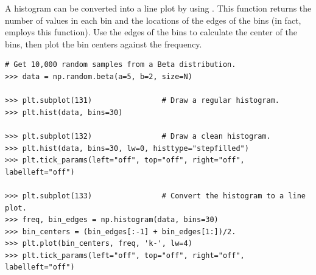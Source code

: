 A histogram can be converted into a line plot by using .
This function returns the number of values in each bin and the locations of the edges of the bins (in fact,  employs this function).
Use the edges of the bins to calculate the center of the bins, then plot the bin centers against the frequency.

\begin{lstlisting}
# Get 10,000 random samples from a Beta distribution.
>>> data = np.random.beta(a=5, b=2, size=N)

>>> plt.subplot(131)                # Draw a regular histogram.
>>> plt.hist(data, bins=30)

>>> plt.subplot(132)                # Draw a clean histogram.
>>> plt.hist(data, bins=30, lw=0, histtype="stepfilled")
>>> plt.tick_params(left="off", top="off", right="off", labelleft="off")

>>> plt.subplot(133)                # Convert the histogram to a line plot.
>>> freq, bin_edges = np.histogram(data, bins=30)
>>> bin_centers = (bin_edges[:-1] + bin_edges[1:])/2.
>>> plt.plot(bin_centers, freq, 'k-', lw=4)
>>> plt.tick_params(left="off", top="off", right="off", labelleft="off")
\end{lstlisting}

